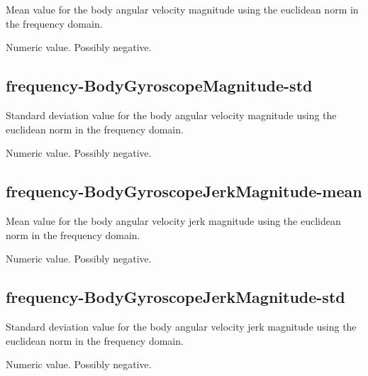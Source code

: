 \documentclass[a4paper,10pt]{report}
\begin{document}
Mean value for the body angular velocity magnitude using the euclidean norm in the frequency domain.

Numeric value. Possibly negative.

\subsection*{frequency-BodyGyroscopeMagnitude-std} 

Standard deviation value for the body angular velocity magnitude using the euclidean norm in the frequency domain.

Numeric value. Possibly negative.

\subsection*{frequency-BodyGyroscopeJerkMagnitude-mean} 

Mean value for the body angular velocity jerk magnitude using the euclidean norm in the frequency domain.

Numeric value. Possibly negative.

\subsection*{frequency-BodyGyroscopeJerkMagnitude-std} 

Standard deviation value for the body angular velocity jerk magnitude using the euclidean norm in the frequency domain.

Numeric value. Possibly negative.
\end{document}
